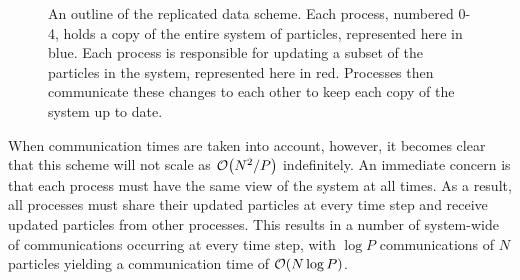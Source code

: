 \begin{figure}[!ht]
    \begin{center}
    \end{center}
    \caption{
        An outline of the replicated data scheme.
        Each process, numbered 0-4,
        holds a copy of the entire system of particles,
        represented here in blue.
        Each process is responsible for updating a subset of the
        particles in the system, represented here in red.
        Processes then communicate these changes to each other
        to keep each copy of the system up to date.
    }
    \label{fig:replicated_data_illustration}
\end{figure}


%
When communication times are taken into account, however, it becomes
clear that this scheme will not scale as $\mathcal{O}{\left({ N^2/P }\right)}$ indefinitely.
%
An immediate concern is that each process must have the same view of the
system at all times.
%
As a result, all processes must share their updated particles at
every time step and receive updated particles from other processes.
%
This results in a number of system-wide of communications occurring
at every time step,
with $\log{P}$ communications of $N$ particles
yielding a communication time of $\mathcal{O}{\left({ N \log{P} }\right)}$.

